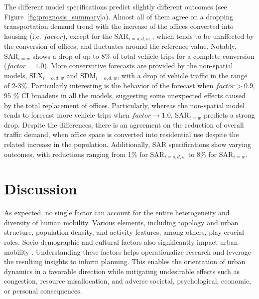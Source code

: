 The different model specifications predict slightly different outcomes (see Figure~\ref{fig:prognosis_summary}a). Almost all of them agree on a dropping transportation demand trend with the increase of the offices converted into housing (i.e. $\mathit{factor}$), except for the $\text{SAR}_{i=o,d,w,}$, which tends to be unaffected by the conversion of offices, and fluctuates around the reference value. Notably, $\text{SAR}_{i=w}$ shows a drop of up to 8\% of total vehicle trips for a complete conversion ($\mathit{factor}=1.0$).  More conservative forecasts are provided by the non-spatial models, $\text{SLX}_{i=o,d,w}$ and $\text{SDM}_{i=o,d,w}$, with a drop of vehicle traffic in the range of 2-3\%. 
Particularly interesting is the behavior of the forecast when $\mathit{factor}>0.9$, 95 \% CI broadens in all the models, suggesting some unexpected effects caused by the total replacement of offices. 
Particularly, whereas the non-spatial model tends to forecast more vehicle trips when $\mathit{factor}\rightarrow1.0$, $\text{SAR}_{i=w}$ predicts a strong drop. Despite the differences, there is an agreement on the reduction of overall traffic demand, when office space is converted into residential use despite the related increase in the population.
Additionally, SAR specifications show varying outcomes, with reductions ranging from 1\% for \(\text{SAR}_{i=o,d,w}\) to 8\% for \(\text{SAR}_{i=w}\).

\section{Discussion}
\label{sec:ETRCO2H_Discussion}

As expected, no single factor can account for the entire heterogeneity and diversity of human mobility. Various elements, including topology and urban structure, population density, and activity features, among others, play crucial roles. Socio-demographic and cultural factors also significantly impact urban mobility \citep{Noulas2012AMobility}. Understanding these factors helps operationalize research and leverage the resulting insights to inform planning. This enables the orientation of urban dynamics in a favorable direction while mitigating undesirable effects such as congestion, resource misallocation, and adverse societal, psychological, economic, or personal consequences.

